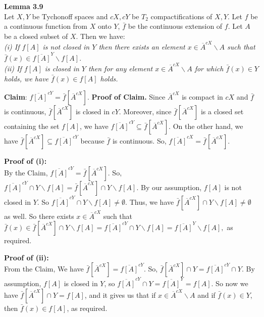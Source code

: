 \documentclass{article}
\begin{document}
\textbf{Lemma 3.9}\\
 Let $X,Y$ be Tychonoff spaces and $cX, cY$ be $T_2$ compactifications of $X,Y$.
 Let $f$ be a continuous function from $X$ onto $Y$, $\bar{f}$ be the continuous extension of $f$. Let $A$ be a closed subset of $X$. Then we have: \\
\emph{(i) If $f[A]$ is not closed in $Y$ then there exists an element $x\in \overline{A}^{cX} \backslash A$ such that $\bar{f}(x) \in \overline{f[A]}^{Y}\backslash f[A].$}\\
\emph{(ii) If $f[A]$ is closed in $Y$ then for any element $x \in \overline{A}^{cX} \backslash A$ for which $\bar{f}(x)\in Y $ holds, we have $\bar{f}(x) \in f[A]$ holds.}\\

\vskip 15pt

\textbf{Claim}: $\overline{f[A]}^{cY} = \bar{f}\left[\overline{A}^{cX}\right]$.
\vskip 10pt
\textbf{Proof of Claim.} Since $\overline{A}^{cX}$ is compact in $cX$ and $\bar{f}$ is continuous, $\bar{f}\left[\overline{A}^{cX}\right]$ is closed in $cY$. Moreover, since $\bar{f}\left[\overline{A}^{cX}\right]$ is a closed set containing the set $f[A]$, we have $\overline{f[A]}^{cY}\subseteq \bar{f}\left[\overline{A}^{cX}\right].$ On the other hand, we have $\bar{f}\left[\overline{A}^{cX}\right]\subseteq \overline{f[A]}^{cY}$ because $\bar{f}$ is continuous. So, $\overline{f[A]}^{cX}=\bar{f}\left[\overline{A}^{cX}\right].$


\vskip 20pt

\textbf{Proof of (i): }\\ 
By the Claim,  $\overline{f[A]}^{cY} = \bar{f}\left[\overline{A}^{cX}\right]$. So, $\overline{f[A]}^{cY}\cap Y \backslash f[A] = \bar{f}\left[\overline{A}^{cX}\right] \cap Y \backslash f[A].$ \vskip 10pt
By our assumption, $f[A]$ is not closed in $Y$. So $\overline{f[A]}^{cY}\cap Y \backslash f[A]\neq \emptyset.$ Thus, we have $\bar{f}\left[\overline{A}^{cX}\right]\cap Y\backslash f[A]\neq \emptyset$ as well. So there exists $x\in \overline{A}^{cX}$ such that $\bar{f}(x)\in \bar{f}\left[\overline{A}^{cX}\right]\cap Y\backslash f[A]=\overline{f[A]}^{cY}\cap Y \backslash f[A]=\overline{f[A]}^Y\backslash f[A],$ as required.



\vskip 25pt

\textbf{Proof of (ii): }\\From the Claim, We have $\bar{f}\left[\overline{A}^{cX}\right] = \overline{f[A]}^{cY}$. So,  $\bar{f}\left[\overline{A}^{cX}\right]\cap Y = \overline{f[A]}^{cY} \cap Y$. By assumption, $f[A]$ is closed in $Y$, so  $\overline{f[A]}^{cY} \cap Y=\overline{f[A]}^Y=f[A]$. 
So now we have $\bar{f}\left[\overline{A}^{cX}\right]\cap Y= f[A]$, and it gives us that if $x \in  \overline{A}^{cX} \backslash A$ and if $\bar{f}(x) \in Y$, then $\bar{f}(x) \in f[A]$, as required.\\
\end{document}
